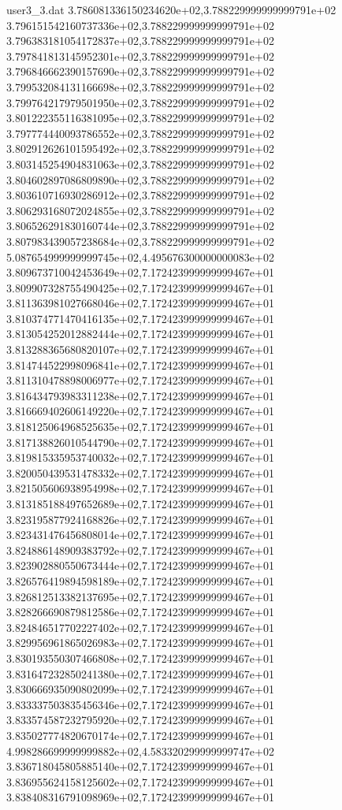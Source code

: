 \begin{filecontents}{user3_3.dat}
3.786081336150234620e+02,3.788229999999999791e+02
3.796151542160737336e+02,3.788229999999999791e+02
3.796383181054172837e+02,3.788229999999999791e+02
3.797841813145952301e+02,3.788229999999999791e+02
3.796846662390157690e+02,3.788229999999999791e+02
3.799532084131166698e+02,3.788229999999999791e+02
3.799764217979501950e+02,3.788229999999999791e+02
3.801222355116381095e+02,3.788229999999999791e+02
3.797774440093786552e+02,3.788229999999999791e+02
3.802912626101595492e+02,3.788229999999999791e+02
3.803145254904831063e+02,3.788229999999999791e+02
3.804602897086809890e+02,3.788229999999999791e+02
3.803610716930286912e+02,3.788229999999999791e+02
3.806293168072024855e+02,3.788229999999999791e+02
3.806526291830160744e+02,3.788229999999999791e+02
3.807983439057238684e+02,3.788229999999999791e+02
5.087654999999999745e+02,4.495676300000000083e+02
3.809673710042453649e+02,7.172423999999999467e+01
3.809907328755490425e+02,7.172423999999999467e+01
3.811363981027668046e+02,7.172423999999999467e+01
3.810374771470416135e+02,7.172423999999999467e+01
3.813054252012882444e+02,7.172423999999999467e+01
3.813288365680820107e+02,7.172423999999999467e+01
3.814744522998096841e+02,7.172423999999999467e+01
3.811310478898006977e+02,7.172423999999999467e+01
3.816434793983311238e+02,7.172423999999999467e+01
3.816669402606149220e+02,7.172423999999999467e+01
3.818125064968525635e+02,7.172423999999999467e+01
3.817138826010544790e+02,7.172423999999999467e+01
3.819815335953740032e+02,7.172423999999999467e+01
3.820050439531478332e+02,7.172423999999999467e+01
3.821505606938954998e+02,7.172423999999999467e+01
3.813185188497652689e+02,7.172423999999999467e+01
3.823195877924168826e+02,7.172423999999999467e+01
3.823431476456808014e+02,7.172423999999999467e+01
3.824886148909383792e+02,7.172423999999999467e+01
3.823902880550673444e+02,7.172423999999999467e+01
3.826576419894598189e+02,7.172423999999999467e+01
3.826812513382137695e+02,7.172423999999999467e+01
3.828266690879812586e+02,7.172423999999999467e+01
3.824846517702227402e+02,7.172423999999999467e+01
3.829956961865026983e+02,7.172423999999999467e+01
3.830193550307466808e+02,7.172423999999999467e+01
3.831647232850241380e+02,7.172423999999999467e+01
3.830666935090802099e+02,7.172423999999999467e+01
3.833337503835456346e+02,7.172423999999999467e+01
3.833574587232795920e+02,7.172423999999999467e+01
3.835027774820670174e+02,7.172423999999999467e+01
4.998286699999999882e+02,4.583320299999999747e+02
3.836718045805885140e+02,7.172423999999999467e+01
3.836955624158125602e+02,7.172423999999999467e+01
3.838408316791098969e+02,7.172423999999999467e+01

\end{filecontents}
